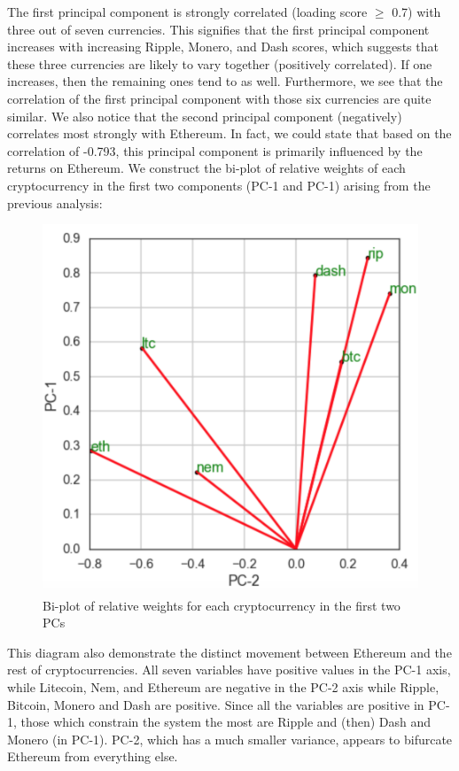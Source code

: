 \documentclass[12pt,twoside]{article}
\begin{document}
\bigbreak
The first principal component is strongly correlated (loading score $\geq$ 0.7) with three out of seven currencies. This signifies that the first principal component increases with increasing Ripple, Monero, and Dash scores, which suggests that these three currencies are likely to vary together (positively correlated). If one increases, then the remaining ones tend to as well. Furthermore, we see that the correlation of the first principal component with those six currencies are quite similar.
\bigbreak
We also notice that the second principal component (negatively) correlates most strongly with Ethereum. In fact, we could state that based on the correlation of -0.793, this principal component is primarily influenced by the returns on Ethereum.
\bigbreak
We construct the bi-plot of relative weights of each cryptocurrency in the first two components (PC-1 and PC-1) arising from the previous analysis:
\bigbreak
\begin{figure}[H]
\begin{center}
\includegraphics[scale=.7]{biplot1.png}
\caption{Bi-plot of relative weights for each cryptocurrency in the first two PCs}
\end{center}
\end{figure}
\bigbreak
This diagram also demonstrate the distinct movement between Ethereum and the rest of cryptocurrencies. All seven variables have positive values in the PC-1 axis, while Litecoin, Nem, and Ethereum are negative in the PC-2 axis while Ripple, Bitcoin, Monero and Dash are positive. Since all the variables are positive in PC-1, those which constrain the system the most are Ripple and (then) Dash and Monero (in PC-1). PC-2, which has a much smaller variance, appears to bifurcate Ethereum from everything else.
\end{document}
